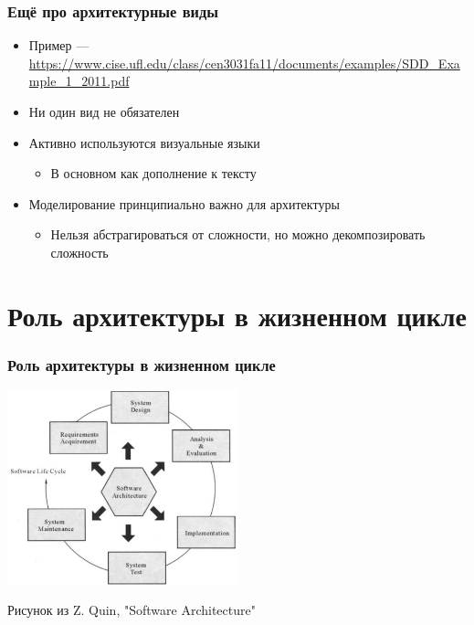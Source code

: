 \documentclass[xetex,mathserif,serif]{beamer}
\begin{document}
	\begin{frame}
		\frametitle{Ещё про архитектурные виды}
		\begin{itemize}
			\item Пример --- \url{https://www.cise.ufl.edu/class/cen3031fa11/documents/examples/SDD\_Example\_1\_2011.pdf}
			\item Ни один вид не обязателен
			\item Активно используются визуальные языки
			\begin{itemize}
				\item В основном как дополнение к тексту
			\end{itemize}
			\item Моделирование принципиально важно для архитектуры
			\begin{itemize}
				\item Нельзя абстрагироваться от сложности, но можно декомпозировать сложность
			\end{itemize}
		\end{itemize}
	\end{frame}

	\section{Роль архитектуры в жизненном цикле}

	\begin{frame}
		\frametitle{Роль архитектуры в жизненном цикле}
		\begin{center}
			\includegraphics[width=0.5\textwidth]{architectureLifeCycle.png}

			\begin{tiny}
				Рисунок из Z. Quin, "Software Architecture"
			\end{tiny}
		\end{center}
	\end{frame}
\end{document}
